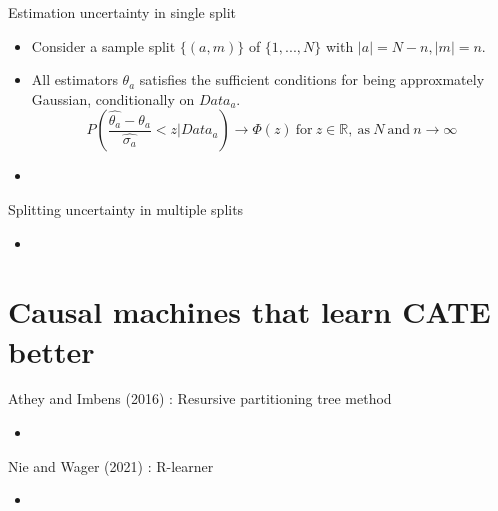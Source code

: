 \documentclass[xcolor=svgnames,aspectratio=169]{beamer}
\newcommand{\R}{\mathbb{R}}
\begin{document}
\begin{frame}{Estimation uncertainty in single split}
    \begin{itemize}
        \item Consider a sample split $\{(a,m)\}$ of $\{1,...,N\}$ with $|a|=N-n, |m|=n$.
        \item All estimators $\theta_a$ satisfies the sufficient conditions for being approxmately Gaussian, conditionally on $Data_a$.
        \[
        P(\frac{\hat{\theta_a}-\theta_a}{\hat{\sigma_a}}<z|Data_a) \to \Phi(z) \ \text{for} \ z\in\R, \ \text{as} \ N \ \text{and} \ n\to\infty
        \]
        \item 
    \end{itemize}
\end{frame}

\begin{frame}{Splitting uncertainty in multiple splits}
    \begin{itemize}
        \item 
    \end{itemize}
\end{frame}

\section{Causal machines that learn CATE better}

\begin{frame}{Athey and Imbens (2016) : Resursive partitioning tree method}
    \begin{itemize}
        \item 
    \end{itemize}
\end{frame}

\begin{frame}{Nie and Wager (2021) : R-learner}
    \begin{itemize}
        \item 
    \end{itemize}
\end{frame}
\end{document}
